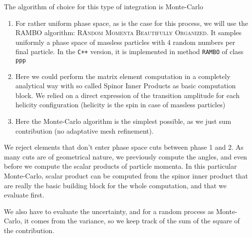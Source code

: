 \documentclass[a4paper]{article}
\begin{document}
The algorithm of choice for this type of integration is Monte-Carlo

\begin{enumerate}
\item For rather uniform phase space, as is the case for this process, we will use the RAMBO algorithm: \textsc{RAndom  Momenta  Beautifully Organized}. It samples uniformly a phase space of massless particles with 4 random numbers per final particle. In the \texttt{C++} version, it is implemented in method \texttt{RAMBO} of class \texttt{ppp}
\item Here we could perform the matrix element computation in a completely analytical way with so called Spinor Inner Products as basic computation block. We relied on a direct expression of the transition amplitude for each helicity configuration (helicity is the spin in case of massless particles)
\item Here the Monte-Carlo algorithm is the simplest possible, as we just sum contribution (no adaptative mesh refinement).
\end{enumerate}

We reject elements that don't enter phase space cuts between phase 1 and 2. As many cuts are of geometrical nature, we previously compute the angles, and even before we compute the scalar products of particle momenta. In this particular Monte-Carlo, scalar product can be computed from the spinor inner product that are really the basic building block for the whole computation, and that we evaluate first.

We also have to evaluate the uncertainty, and for a random process as Monte-Carlo, it comes from the variance, so we keep track of the sum of the square of the contribution.
\end{document}

